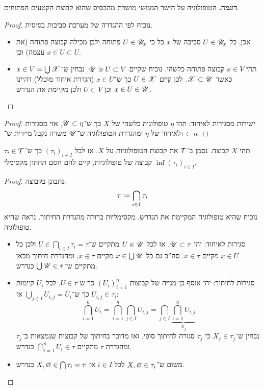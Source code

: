 \documentclass[name=רשימות טופולוגיה כללית]{../../../tex/classes/noChapterMegasumPreamble}
\begin{document}
	\textbf{דוגמה. }הטופולוגיה על הישר הממשי מושרת מהבסיס שהוא קבוצת הקטעים הפתוחים. 
	\begin{proof}
		נוכיח לפי ההגדרה של מערכת סביבות בסיסית. 
		\begin{itemize}
			\item אכן, כל $U \in \mathscr{U}_x$ סביבה של $x$ כל כי $U \in \mathscr{U}_x$ פתוחה ולכן מכילה קבוצה פתוחה (את עצמה) וכן $x \in U \subset U$. 
			\item תהי $x \in V$ קבוצה פתוחה כלשהי. נוכיח שקיים $\mathscr{U}\ni U \subset V$. נבחין ש־$x \in V = \bigcup \mathscr{X}$ כאשר $\mathscr{X}\subset \mathscr{U}$. לכן קיים $U \in \mathscr{X}$ כך ש־$x \in U$ (הגדרת איחוד מוכלל) דהיינו $x \in U \in \mathscr{U}$ וכן $U \subset V$ ולכן מקיימת את הנדרש. 
		\end{itemize}
	\end{proof}
	\begin{proof}
		ישירות מסגירות לאיחוד: תהי $\eta$ טופולוגיה כלשהי של $X$ כך ש־$\mathscr{U}\subset \eta$, אזי מסגירות לאיחוד של $\eta$ ומהגדרת הטופולוגיה ש־$\mathscr{U}$ משרה נקבל מיידית ש־$\tau \subset\eta$. 
	\end{proof}
	\begin{Claim}\label{clm:topoinfimum}
		תהי $X$ קבוצה. נסמן ב־$\mathcal{T}$ את קבוצת הטופולוגיות על $X$. אז לכל $(\tau_i)_{i \in I}$ כך ש־$\tau_i \in \mathcal{T}$ קבוצה של טופולוגיות, קיים להם חסם תחתון מקסימלי $\inf (\tau_i)_{i \in I}$. 
	\end{Claim}\begin{proof}
		נתבונן בקבוצה: 
		\[ \tau \coloneqq \bigcap_{i \in I}\tau_i \]
		נוכיח שהיא טופולוגיה המקיימת את הנדרש. מקסימליות ברורה מהגדרת החיתוך. נראה שהיא טופולוגיה. 
		\begin{itemize}
			\item סגירות לאיחוד: יהי $\mathscr{U}\subset \tau$. אז לכל $U \in \mathscr{U}$ מתקיים ש־$U \in \bigcap_{i \in I} \tau_i = \tau$ ולכן כל $x \in U$ מקיים $x \in \tau$. סה''כ גם כל $x \in \bigcup \mathscr{U}$ מקיים $x \in \tau$, ומהגדרת חיתוך מכאן מתקיים ש־$\bigcup \mathscr{U} \in \tau$ כנדרש.
			\item סגירות לחיתוך: יהי אוסף בן־מנייה של קבוצות $(U_i)_{i = 1}^{n}$ כך ש־$U \in \tau$. לכל $U_i$ קיימות $U_{i, j} \in \tau_i$  כך ש־$\bigcup_{j \in I}U_{i, j} = U_i$
			אז: 
			\[ \bigcap_{i = 1}^{n} U_i = \bigcap_{i = 1}^{n} \bigcap_{j \in I}^{}U_{i, j} = \bigcap_{j \in I}^{}\underbrace{\bigcap_{i = 1}^{n} U_{i, j}}_{X_j} \]
			נבחין ש־$X_j \in \tau_j$ כי $\tau_j$ סגורה לחיתוך סופי. ואז מדובר בחיתוך של קבוצות שנמצאות ב־$\tau_j$ ומהגדרת $\tau$ מתקיים $\bigcap_{i = 1}^{n} U_i \in \tau$ כנדרש. 
			\item משום ש־$X, \varnothing \in \tau_i$ לכל $i \in I$ אז $X, \varnothing \in \bigcap \tau_i = \tau$ כנדרש. 
		\end{itemize}\envendproof
	\end{proof}
	
\end{document}
